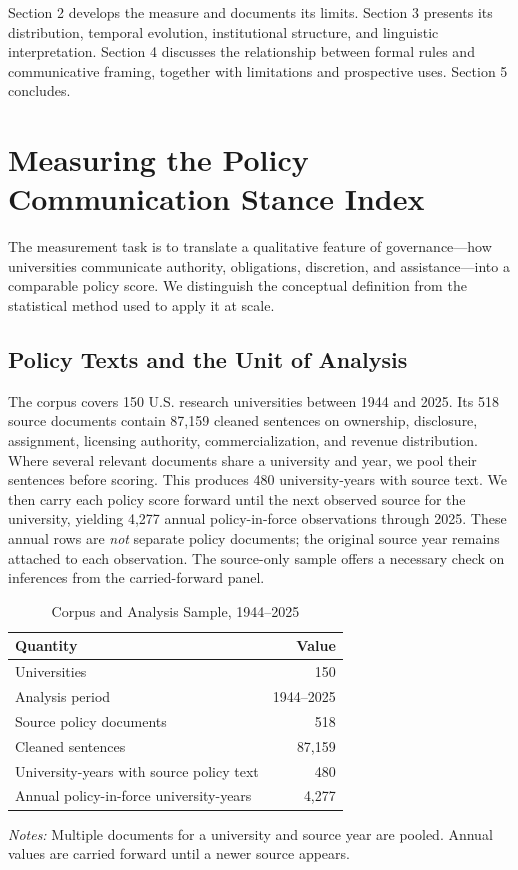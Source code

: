 \documentclass[11pt]{article}
\begin{document}
Section 2 develops the measure and documents its limits. Section 3 presents its distribution, temporal evolution, institutional structure, and linguistic interpretation. Section 4 discusses the relationship between formal rules and communicative framing, together with limitations and prospective uses. Section 5 concludes.

\section{Measuring the Policy Communication Stance Index}
The measurement task is to translate a qualitative feature of governance---how universities communicate authority, obligations, discretion, and assistance---into a comparable policy score. We distinguish the conceptual definition from the statistical method used to apply it at scale.

\subsection{Policy Texts and the Unit of Analysis}
The corpus covers 150 U.S. research universities between 1944 and 2025. Its 518 source documents contain 87,159 cleaned sentences on ownership, disclosure, assignment, licensing authority, commercialization, and revenue distribution. Where several relevant documents share a university and year, we pool their sentences before scoring. This produces 480 university-years with source text. We then carry each policy score forward until the next observed source for the university, yielding 4,277 annual policy-in-force observations through 2025. These annual rows are \emph{not} separate policy documents; the original source year remains attached to each observation. The source-only sample offers a necessary check on inferences from the carried-forward panel.

\begin{table}[htbp]\centering\caption{Corpus and Analysis Sample, 1944--2025}\label{tab:sample}
\begin{tabular}{lr}\toprule Quantity&Value\\\midrule Universities&150\\Analysis period&1944--2025\\Source policy documents&518\\Cleaned sentences&87,159\\University-years with source policy text&480\\Annual policy-in-force university-years&4,277\\\bottomrule\end{tabular}
\par\smallskip\begin{minipage}{0.88\linewidth}\footnotesize\emph{Notes:} Multiple documents for a university and source year are pooled. Annual values are carried forward until a newer source appears.\end{minipage}
\end{table}
\end{document}

